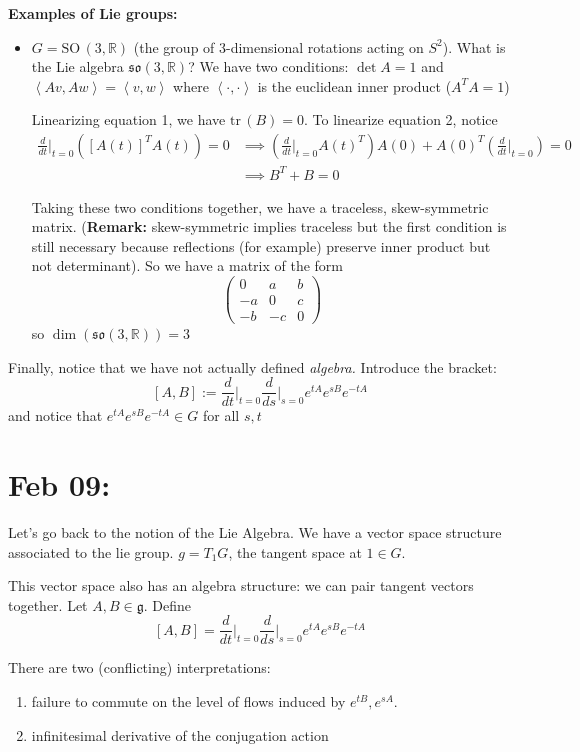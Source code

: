\documentclass[12pt]{article}
\newcommand{\R}{\mathbb{R}}
\newcommand{\brak}[1]{\left\langle #1 \right\rangle}
\newcommand{\SO}{\text{SO}\,}
\newcommand{\tr}{\text{tr}\,}
\newcommand{\sof}{\mathfrak{so}}
\begin{document}
    \textbf{Examples of Lie groups:}
    \begin{itemize}
        \item $G = \SO(3, \R)$ (the group of 3-dimensional rotations acting on $S^2$). What is the Lie algebra $\sof(3, \R)$? We have two conditions: $\det A = 1$ and $\brak{Av, Aw} = \brak{v, w}$ where $\brak{\cdot, \cdot}$ is the euclidean inner product ($A^TA = 1$)
        
        Linearizing equation 1, we have $\tr(B) = 0$. To linearize equation 2, notice 
        \begin{align*}
            \frac{d}{dt}\bigg\vert_{t=0}([A(t)]^T A(t)) = 0 &\implies (\frac{d}{dt}\bigg\vert_{t=0} A(t)^T)A(0) + A(0)^T (\frac{d}{dt}\bigg\vert_{t=0}) = 0\\ 
            &\implies B^T + B= 0 
        \end{align*}

        Taking these two conditions together, we have a traceless, skew-symmetric matrix. (\textbf{Remark:} skew-symmetric implies traceless but the first condition is still necessary because reflections (for example) preserve inner product but not determinant). So we have a matrix of the form 
        \[\begin{pmatrix}
            0 & a & b\\ 
            -a & 0 & c\\ 
            -b & -c & 0
        \end{pmatrix}\]
        so $\dim(\sof(3, \R)) = 3$
    \end{itemize}

    Finally, notice that we have not actually defined \emph{algebra.} Introduce the bracket: 
    \[[A, B] := \frac{d}{dt}\bigg\vert_{t=0} \frac{d}{ds}\bigg\vert_{s=0} e^{tA}e^{sB}e^{-tA}\] 
    and notice that $e^{tA}e^{sB}e^{-tA} \in G$ for all $s, t$ 

\section{Feb 09:} 
    Let's go back to the notion of the Lie Algebra. We have a vector space structure associated to the lie group. $g = T_1 G$, the tangent space at $1 \in G$. 

    This vector space also has an algebra structure: we can pair tangent vectors together. Let $A, B \in \mathfrak{g}$. Define
    \[[A, B] = \frac{d}{dt}\bigg\vert_{t=0} \frac{d}{ds}\bigg\vert_{s=0}e^{tA}e^{sB}e^{-tA}\]

    There are two (conflicting) interpretations:
    \begin{enumerate}
        \item failure to commute on the level of flows induced by $e^{tB}, e^{sA}$.
        \item infinitesimal derivative of the conjugation action 
    \end{enumerate}
\end{document}

